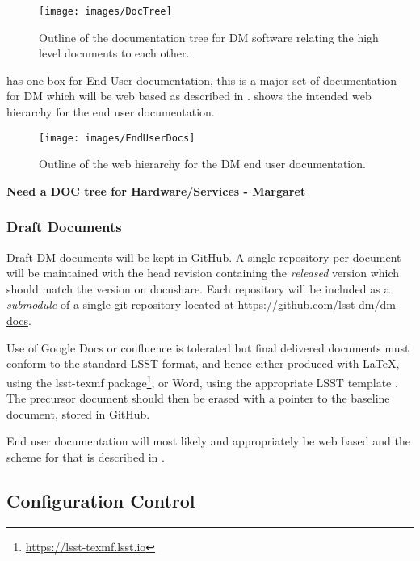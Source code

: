 \begin{figure}
\begin{center}
 \texttt{[image: images/DocTree]}
\caption{Outline of the documentation tree for DM software relating the high level documents to each other. \label{fig:doctree}}
\end{center}
\end{figure}

 has one box for End User documentation, this is a major set of documentation for DM which will be web based as  described in  .  shows the intended web hierarchy for  the end user documentation.

\begin{figure}
\begin{center}
 \texttt{[image: images/EndUserDocs]}
\caption{Outline of the web hierarchy for the DM end user documentation. \label{fig:eudoc}}
\end{center}
\end{figure}


{\bf Need a DOC tree for Hardware/Services  - Margaret }

\subsubsection{Draft Documents}

Draft DM documents will be kept in GitHub. A single repository per document will be maintained with the head revision containing the {\em released } version which should match the version on docushare. Each repository will be included as a {\em submodule} of a single git repository located at \url{https://github.com/lsst-dm/dm-docs}.

Use of Google Docs or confluence is tolerated but final delivered documents must conform to the standard LSST format, and hence either produced with LaTeX, using the lsst-texmf package\footnote{\url{https://lsst-texmf.lsst.io}}, or Word, using the appropriate LSST template . The precursor document should then be erased with a pointer to the baseline document, stored in GitHub.

End user documentation will most likely and appropriately be web based and the scheme for that is described in .

\subsection {Configuration Control} \label{sect:config}

